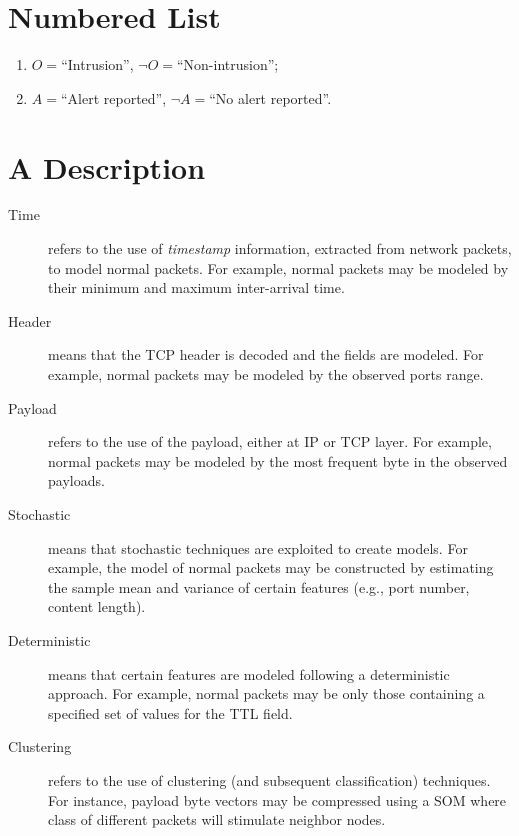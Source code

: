 
\section{Numbered List}

\begin{enumerate}
\item $O = $``Intrusion'', $\neg O =$``Non-intrusion'';
\item $A = $``Alert reported'', $\neg A =$``No alert reported''.
\end{enumerate}


\section{A Description}

\begin{description}
\item[Time] refers to the use of \emph{timestamp} information, extracted from network packets, to model normal packets. For example, normal packets may be modeled by their minimum and maximum inter-arrival time.
\item[Header] means that the \ac{TCP} header is decoded and the fields are modeled. For example, normal packets may be modeled by the observed ports range.
\item[Payload] refers to the use of the payload, either at
\ac{IP} or \ac{TCP} layer. For example, normal packets may be modeled by the most frequent byte in the observed payloads.
\item[Stochastic] means that stochastic techniques are exploited to create models. For example, the model of normal packets may be constructed by estimating the sample mean and variance of certain features (e.g., port number, content length).
\item[Deterministic] means that certain features are modeled following a deterministic approach. For example, normal packets may be only those containing a specified set of values for the \ac{TTL} field.
\item[Clustering] refers to the use of clustering (and subsequent classification) techniques. For instance, payload byte vectors may be compressed using a \ac{SOM} where class of different packets will stimulate neighbor nodes.
\end{description}

